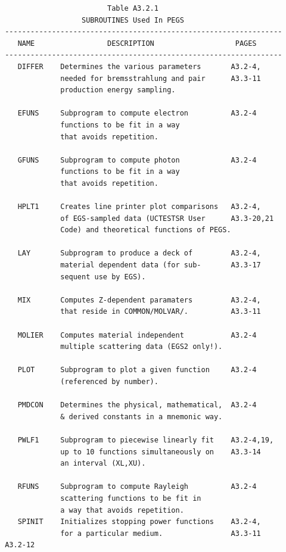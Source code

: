 \newpage {} \begin{verbatim}
                         Table A3.2.1
                   SUBROUTINES Used In PEGS
 -----------------------------------------------------------------
    NAME                 DESCRIPTION                   PAGES
 -----------------------------------------------------------------
    DIFFER    Determines the various parameters       A3.2-4,
              needed for bremsstrahlung and pair      A3.3-11
              production energy sampling.

    EFUNS     Subprogram to compute electron          A3.2-4
              functions to be fit in a way
              that avoids repetition.

    GFUNS     Subprogram to compute photon            A3.2-4
              functions to be fit in a way
              that avoids repetition.

    HPLT1     Creates line printer plot comparisons   A3.2-4,
              of EGS-sampled data (UCTESTSR User      A3.3-20,21
              Code) and theoretical functions of PEGS.

    LAY       Subprogram to produce a deck of         A3.2-4,
              material dependent data (for sub-       A3.3-17
              sequent use by EGS).

    MIX       Computes Z-dependent paramaters         A3.2-4,
              that reside in COMMON/MOLVAR/.          A3.3-11

    MOLIER    Computes material independent           A3.2-4
              multiple scattering data (EGS2 only!).

    PLOT      Subprogram to plot a given function     A3.2-4
              (referenced by number).

    PMDCON    Determines the physical, mathematical,  A3.2-4
              & derived constants in a mnemonic way.

    PWLF1     Subprogram to piecewise linearly fit    A3.2-4,19,
              up to 10 functions simultaneously on    A3.3-14
              an interval (XL,XU).

    RFUNS     Subprogram to compute Rayleigh          A3.2-4
              scattering functions to be fit in
              a way that avoids repetition.
    SPINIT    Initializes stopping power functions    A3.2-4,
              for a particular medium.                A3.3-11
 A3.2-12
\end{verbatim}
